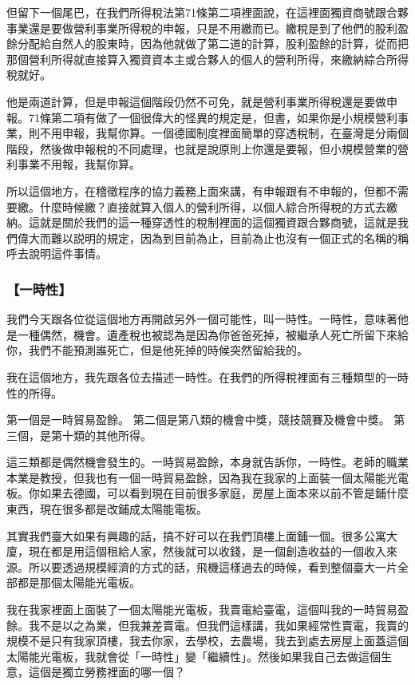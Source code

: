 \documentclass[oneside,sub3section]{ctexbook}
\begin{document}
但留下一個尾巴，在我們所得稅法第71條第二項裡面說，在這裡面獨資商號跟合夥事業還是要做營利事業所得稅的申報，只是不用繳而已。繳稅是到了他們的股利盈餘分配給自然人的股東時，因為他就做了第二道的計算，股利盈餘的計算，從而把那個營利所得就直接算入獨資資本主或合夥人的個人的營利所得，來繳納綜合所得稅就好。

他是兩道計算，但是申報這個階段仍然不可免，就是營利事業所得稅還是要做申報。71條第二項有做了一個很偉大的怪異的規定是，但書，如果你是小規模營利事業，則不用申報，我幫你算。一個德國制度裡面簡單的穿透稅制，在臺灣是分兩個階段，然後做申報稅的不同處理，也就是說原則上你還是要報，但小規模營業的營利事業不用報，我幫你算。

所以這個地方，在稽徵程序的協力義務上面來講，有申報跟有不申報的，但都不需要繳。什麼時候繳？直接就算入個人的營利所得，以個人綜合所得稅的方式去繳納。這就是關於我們的這一種穿透性的稅制裡面的這個獨資跟合夥商號，這就是我們偉大而難以説明的規定，因為到目前為止，目前為止也沒有一個正式的名稱的稱呼去說明這件事情。

\hypertarget{ux4e00ux6642ux6027}{%
\subsubsection{【一時性】}\label{ux4e00ux6642ux6027}}

我們今天跟各位從這個地方再開啟另外一個可能性，叫一時性。一時性，意味著他是一種偶然，機會。遺產稅也被認為是因為你爸爸死掉，被繼承人死亡所留下來給你，我們不能預測誰死亡，但是他死掉的時候突然留給我的。

我在這個地方，我先跟各位去描述一時性。在我們的所得稅裡面有三種類型的一時性的所得。

第一個是一時貿易盈餘。
第二個是第八類的機會中獎，競技競賽及機會中獎。
第三個，是第十類的其他所得。

這三類都是偶然機會發生的。一時貿易盈餘，本身就告訴你，一時性。老師的職業本業是教授，但我也有一個一時貿易盈餘，因為我在我家的上面裝一個太陽能光電板。你如果去德國，可以看到現在目前很多家庭，房屋上面本來以前不管是鋪什麼東西，現在很多都是改鋪成太陽能電板。

其實我們臺大如果有興趣的話，搞不好可以在我們頂樓上面鋪一個。很多公寓大廈，現在都是用這個租給人家，然後就可以收錢，是一個創造收益的一個收入來源。所以要透過規模經濟的方式的話，飛機這樣過去的時候，看到整個臺大一片全部都是那個太陽能光電板。

我在我家裡面上面裝了一個太陽能光電板，我賣電給臺電，這個叫我的一時貿易盈餘。我不是以之為業，但我兼差賣電。但我們這樣講，我如果經常性賣電，我賣的規模不是只有我家頂樓，我去你家，去學校，去農場，我去到處去房屋上面蓋這個太陽能光電板，我就會從「一時性」變「繼續性」。然後如果我自己去做這個生意，這個是獨立勞務裡面的哪一個？
\end{document}
